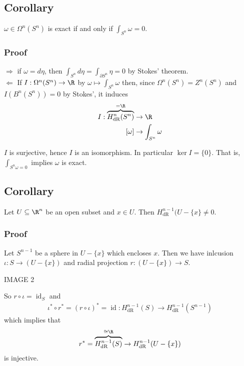 \documentclass[11pt]{article}
\begin{document}
\subsection*{Corollary}
\label{sec:org20f65c7}
\(\omega\in\Omega^{n}(S^{n})\) is exact if and only if \(\int_{S^{n}}\omega=0\).\\
\subsubsection*{Proof}
\label{sec:org1645d5d}
\(\Longrightarrow\) if \(\omega=d\eta\), then \(\int_{S^{n}}d\eta=\int_{\partial S^{n}}\eta=0\) by Stokes' theorem.\\
\(\Longleftarrow\) If \(I:\Omega^{n}(S^{n})\to\R\) by \(\omega\mapsto\int_{S^{n}}\omega\) then, since \(\Omega^{n}(S^{n})=Z^{n}(S^{n})\) and \(I(B^{n}(S^{n}))=0\) by Stokes', it induces\\
\begin{align*}
  I:\overbrace{H^{n}_{\text{dR}}(S^{n})}^{=\R} &\to \R \\
  [\omega] &\to\int_{S^{n}}\omega
\end{align*}

\(I\) is surjective, hence \(I\) is an isomorphism. In particular \(\ker I=\{0\}\). That is, \(\int_{S^{n}\omega=0}\) implies \(\omega\) is exact.\\
\subsection*{Corollary}
\label{sec:org9170fae}
Let \(U\subseteq \R^{n}\) be an open subset and \(x\in U\). Then \(H^{n-1}_{\text{dR}}(U-\{x\}\neq 0\).\\
\subsubsection*{Proof}
\label{sec:orga59eb4a}
Let \(S^{n-1}\) be a sphere in \(U-\{x\}\) which encloses \(x\). Then we have inlcusion \(\iota:S\to(U-\{x\})\) and radial projection \(r:(U-\{x\})\to S\).\\
\begin{center}
IMAGE 2\\
\end{center}
So \(r\circ\iota=\operatorname{id}_{S}\) and\\
\begin{align*}
  \iota^{*}\circ r^{*}
  =(r\circ\iota)^{*}
  =\operatorname{id}:H^{n-1}_{\text{dR}}(S)\to H^{n-1}_{\text{dR}}(S^{n-1})
\end{align*}
which implies that\\
\begin{align*}
  r^{*}
  =\overbrace{H^{n-1}_{\text{dR}}(S)}^{\cong\R}
  \to H^{n-1}_{\text{dR}}(U-\{x\})
\end{align*}
is injective.\\
\end{document}
